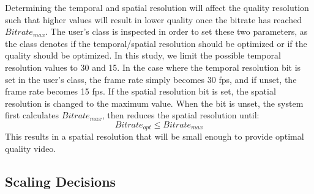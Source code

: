 \documentclass[3p,times,procedia]{elsarticle}
\begin{document}
Determining the temporal and spatial resolution will affect the quality resolution such that higher values will result in lower quality once the bitrate has reached $Bitrate_{max}$. The user's class is inspected in order to set these two parameters, as the class denotes if the temporal/spatial resolution should be optimized or if the quality should be optimized. In this study, we limit the possible temporal resolution values to 30 and 15. In the case where the temporal resolution bit is set in the user’s class, the frame rate simply becomes 30 fps, and if unset, the frame rate becomes 15 fps. If the spatial resolution bit is set, the spatial resolution is changed to the maximum value. When the bit is unset, the system first calculates $Bitrate_{max}$, then reduces the spatial resolution until:
\begin{equation}
\label{equ:OptMaxRelation}
Bitrate_{opt} \le Bitrate_{max}
\end{equation}
This results in a spatial resolution that will be small enough to provide optimal quality video.

\subsection{Scaling Decisions}
\end{document}
